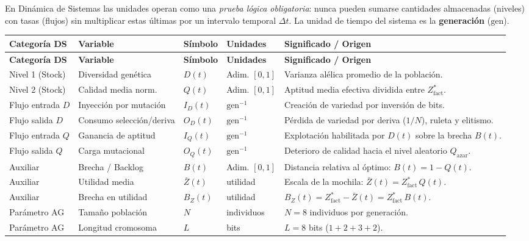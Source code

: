 \documentclass[11pt,a4paper]{article}
\begin{document}
En Din\'amica de Sistemas las unidades operan como una \emph{prueba l\'ogica obligatoria}: nunca pueden sumarse cantidades almacenadas (niveles) con tasas (flujos) sin multiplicar estas \'ultimas por un intervalo temporal $\Delta t$. La unidad de tiempo del sistema es la \textbf{generaci\'on} ($\text{gen}$).

\begin{longtable}{@{}p{2.3cm}p{3.0cm}p{1.6cm}p{2.1cm}p{5.5cm}@{}}
\toprule
\textbf{Categor\'ia DS} & \textbf{Variable} & \textbf{S\'imbolo} & \textbf{Unidades} & \textbf{Significado / Origen} \\
\midrule
\endfirsthead
\toprule
\textbf{Categor\'ia DS} & \textbf{Variable} & \textbf{S\'imbolo} & \textbf{Unidades} & \textbf{Significado / Origen} \\
\midrule
\endhead
Nivel 1 (Stock) & Diversidad gen\'etica & $D(t)$ & Adim. $[0,1]$ & Varianza al\'elica promedio de la poblaci\'on. \\
Nivel 2 (Stock) & Calidad media norm. & $Q(t)$ & Adim. $[0,1]$ & Aptitud media efectiva dividida entre $Z^*_{\text{fact}}$. \\
Flujo entrada $D$ & Inyecci\'on por mutaci\'on & $I_D(t)$ & $\text{gen}^{-1}$ & Creaci\'on de variedad por inversi\'on de bits. \\
Flujo salida $D$ & Consumo selecci\'on/deriva & $O_D(t)$ & $\text{gen}^{-1}$ & P\'erdida de variedad por deriva ($1/N$), ruleta y elitismo. \\
Flujo entrada $Q$ & Ganancia de aptitud & $I_Q(t)$ & $\text{gen}^{-1}$ & Explotaci\'on habilitada por $D(t)$ sobre la brecha $B(t)$. \\
Flujo salida $Q$ & Carga mutacional & $O_Q(t)$ & $\text{gen}^{-1}$ & Deterioro de calidad hacia el nivel aleatorio $Q_{\text{azar}}$. \\
Auxiliar & Brecha / Backlog & $B(t)$ & Adim. $[0,1]$ & Distancia relativa al \'optimo: $B(t) = 1 - Q(t)$. \\
Auxiliar & Utilidad media & $\bar{Z}(t)$ & utilidad & Escala de la mochila: $\bar{Z}(t) = Z^*_{\text{fact}}\,Q(t)$. \\
Auxiliar & Brecha en utilidad & $B_Z(t)$ & utilidad & $B_Z(t) = Z^*_{\text{fact}} - \bar{Z}(t) = Z^*_{\text{fact}}\,B(t)$. \\
Par\'ametro AG & Tama\~no poblaci\'on & $N$ & individuos & $N = 8$ individuos por generaci\'on. \\
Par\'ametro AG & Longitud cromosoma & $L$ & bits & $L = 8$ bits ($1+2+3+2$). \\

\end{longtable}
\end{document}
